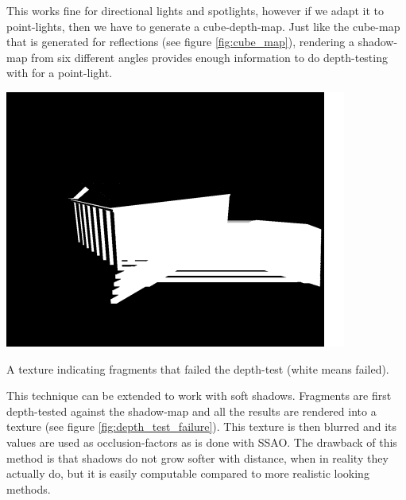 \documentclass{ACGSeminar}
\begin{document}
		This works fine for directional lights and spotlights, however if we adapt it to point-lights, then we have to generate a cube-depth-map. Just like the cube-map that is generated for reflections (see figure \ref{fig:cube_map}), rendering a shadow-map from six different angles provides enough information to do depth-testing with for a point-light. \\
		\begin{floatingfigure}[l]{.265625\textwidth}%
			\includegraphics[width=.265625\textwidth]{img/depth_test_failure.png}
			\caption{A texture indicating fragments that failed the depth-test (white means failed).}%
			\label{fig:depth_test_failure}%
		\end{floatingfigure}%
		This technique can be extended to work with soft shadows. Fragments are first depth-tested against the shadow-map and all the results are rendered into a texture (see figure \ref{fig:depth_test_failure}). This texture is then blurred and its values are used as occlusion-factors as is done with SSAO. The drawback of this method is that shadows do not grow softer with distance, when in reality they actually do, but it is easily computable compared to more realistic looking methods. \\\\\\\\\\
\end{document}
